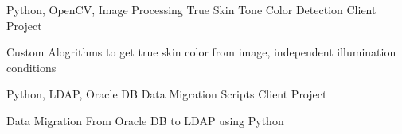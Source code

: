 

\begin{cventries}


  \cventry
    {Python, OpenCV, Image Processing} %
    {True Skin Tone Color Detection} %
    {Client Project} %
    {} %
    {
      \begin{cvitems} %
        \item {Custom Alogrithms to get true skin color from image, independent illumination conditions}
      \end{cvitems}
    }
  \cventry
    {Python, LDAP, Oracle DB} %
    {Data Migration Scripts} %
    {Client Project} %
    {} %
    {
      \begin{cvitems} %
        \item {Data Migration From Oracle DB to LDAP using Python}
      \end{cvitems}
    }


\end{cventries}
